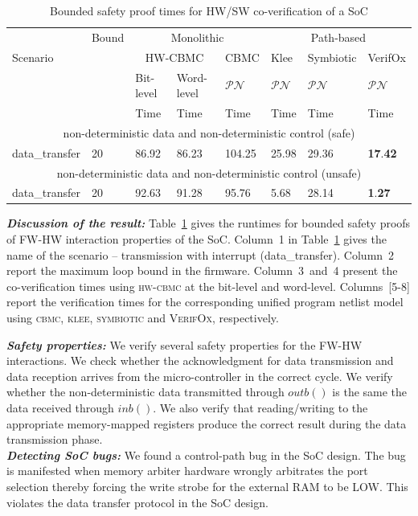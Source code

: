 \documentclass[sigconf]{acmart}
\newcommand{\tool}[1]{\textsc{#1}\xspace}
\newcommand{\cbmcv}{\tool{cbmc}}
\newcommand{\hwcbmcv}{\tool{hw-cbmc}}
\newcommand{\verifox}{\tool{VerifOx}}
\newcommand{\klee}{\tool{klee}}
\begin{document}
\begin{table}
\begin{center}
{
\begin{scriptsize}
\begin{tabular}{|l|l|l|l|l|l|l|l|}
\hline
  & Bound & \multicolumn{3}{c|}{Monolithic} & \multicolumn{3}{c|}{Path-based} \\ 
\cline{3-8}
 Scenario &  & \multicolumn{2}{c|}{HW-CBMC} & CBMC & Klee & Symbiotic & VerifOx \\ 
\cline{3-8}
      &       &  Bit-level & Word-level & $\mathcal{PN}$ & $\mathcal{PN}$ & $\mathcal{PN}$ & $\mathcal{PN}$ \\
\cline{1-8}
      &       &   Time     &   Time      & Time  &  Time & Time & Time \\
\cline{1-8}      
\multicolumn{8}{|c|}{non-deterministic data and non-deterministic control (safe)} \\ \hline
data\_transfer & 20 & 86.92 & 86.23 & 104.25 & 25.98 & 29.36 &
\textbf{17}.\textbf{42} \\ 
\hline
\multicolumn{8}{|c|}{non-deterministic data and non-deterministic control
(unsafe)} \\ \hline
data\_transfer & 20 & 92.63 & 91.28 & 95.76 & 5.68 & 28.14 &
\textbf{1}.\textbf{27} \\ 
\hline
\end{tabular}
\end{scriptsize}
}
\end{center}
\vspace{-1.3mm}
\caption{Bounded safety proof times for HW/SW co-verification of a SoC 
\label{table:SoC}}
\end{table}

\textbf{\emph{Discussion of the result:}}
%
Table~\ref{table:SoC} gives the runtimes for bounded safety proofs of 
FW-HW interaction properties of the SoC.  Column~1 in
Table~\ref{table:SoC} gives the name of the scenario -- transmission with
interrupt (data\_transfer).  Column~2 report the maximum loop bound in the
firmware.  Column~3~and~4 present the co-verification times using \hwcbmcv
at the bit-level and word-level.  Columns~[5-8] report the
verification times for the corresponding unified program netlist model using
\cbmcv, \klee, \textsc{symbiotic} and \verifox, respectively.  

\textbf{\emph{Safety properties:}}
%
We verify several safety properties for the FW-HW interactions.  We check
whether the acknowledgment for data transmission and data reception arrives
from the micro-controller in the correct cycle.  We verify whether the
non-deterministic data transmitted through $outb()$ is the same
the data received through $inb()$.  We also verify that
reading/writing to the appropriate memory-mapped registers produce the
correct result during the data transmission phase.\\ \textbf{\emph{Detecting
SoC bugs:}} We found a control-path bug in the SoC design.  The bug is
manifested when memory arbiter hardware wrongly arbitrates the port
selection thereby forcing the write strobe for the external RAM to be LOW. 
This violates the data transfer protocol in the SoC design.
\end{document}
